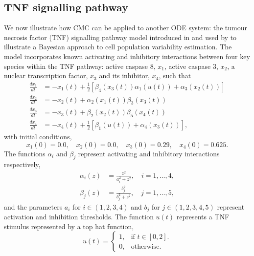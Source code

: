 \subsection{TNF signalling pathway}
We now illustrate how CMC can be applied to another ODE system: the tumour necrosis factor (TNF) signalling pathway model introduced in \cite{chaves2008bistable} and used by \cite{hasenauer2011identification} to illustrate a Bayesian approach to cell population variability estimation. The model incorporates known activating and inhibitory interactions between four key species within the TNF pathway: active caspase 8, $x_1$, active caspase 3, $x_2$, a nuclear transcription factor, $x_3$ and its inhibitor, $x_4$, such that
%
\begin{equation}\label{eq:tnf}
\begin{aligned}
\frac{dx_1}{dt} &= -x_1(t) + \frac{1}{2}\left[\beta_4(x_3(t))\alpha_1(u(t)) + \alpha_3(x_2(t))\right]\\
\frac{dx_2}{dt} &= -x_2(t) + \alpha_2(x_1(t)) \beta_3(x_3(t))\\
\frac{dx_3}{dt} &= -x_3(t) + \beta_2(x_2(t)) \beta_5(x_4(t))\\
\frac{dx_4}{dt} &= -x_4(t) + \frac{1}{2}\left[\beta_1(u(t)) + \alpha_4(x_3(t))\right],
\end{aligned}
\end{equation}
%
with initial conditions,
\begin{equation}
x_1(0)=0.0, \quad x_2(0)=0.0, \quad x_3(0)=0.29, \quad x_4(0)=0.625.
\end{equation}
The functions $\alpha_i$ and $\beta_j$ represent activating and inhibitory interactions respectively,
%
\begin{equation}
\begin{aligned}
\alpha_i(z) &= \frac{z^2}{a_i^2 + z^2}, \quad i=1, \dots, 4,\\
\beta_j(z)  &= \frac{b_j^2}{b_j^2 + z^2}, \quad j = 1, \dots, 5,
\end{aligned}
\end{equation}
%
and the parameters $a_i$ for $i\in(1,2,3,4)$ and $b_j$ for $j\in(1,2,3,4,5)$ represent activation and inhibition thresholds. The function $u(t)$ represents a TNF stimulus represented by a top hat function,
%
\begin{equation}
u(t)=\begin{cases}
1, & \text{if $t\in[0,2]$}.\\
0, & \text{otherwise}.
\end{cases}
\end{equation}
%

